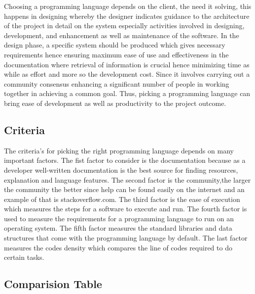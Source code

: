 Choosing a programming language depends on the client, the need it solving, this happens in designing
whereby the designer indicates guidance to the architecture of the project in detail on the system
especially activities involved in designing, development, and enhancement as well as maintenance of the
software. In the design phase, a specific system should be produced which gives necessary requirements
hence ensuring maximum ease of use and effectiveness in the documentation where retrieval of
information is crucial hence minimizing time as while as effort and more so the development cost. Since
it involves carrying out a community consensus enhancing a significant number of people in working
together in achieving a common goal. Thus, picking a programming language can bring ease of
development as well as productivity to the project outcome.

\subsection{Criteria}
The criteria’s for picking the right programming language depends on many important factors. The fist
factor to consider is the documentation because as a developer well-written documentation is the best
source for finding resources, explanation and language features. The second factor is the community,the larger the community the better since help can be found easily on the internet and an example of
that is stackoverflow.com. The third factor is the ease of execution which measures the steps for a
software to execute and run. The fourth factor is used to measure the requirements for a programming
language to run on an operating system. The fifth factor measures the standard libraries and data
structures that come with the programming language by default. The last factor measures the codes
density which compares the line of codes required to do certain tasks.

\subsection{Comparision Table}

